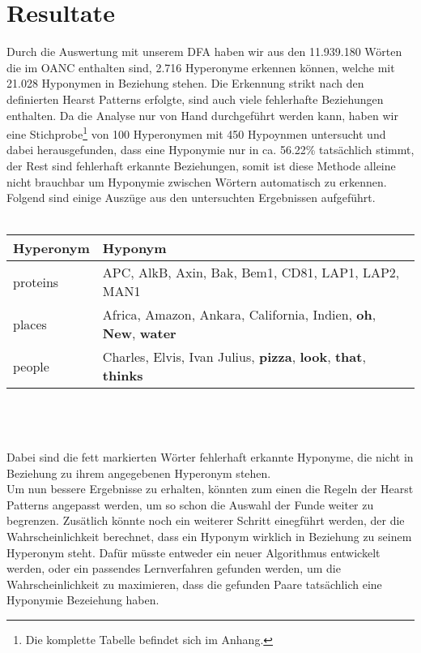 \section{Resultate}%
%
Durch die Auswertung mit unserem DFA haben wir aus den 11.939.180 Wörten
die im OANC enthalten sind, 2.716 Hyperonyme erkennen können, welche
mit 21.028 Hyponymen in Beziehung stehen. Die Erkennung strikt nach
den definierten Hearst Patterns erfolgte, sind auch viele fehlerhafte
Beziehungen enthalten. Da die Analyse nur von Hand durchgeführt werden
kann, haben wir eine Stichprobe\footnote{Die komplette Tabelle
  befindet sich im Anhang.} von 100 Hyperonymen mit 450 Hypoynmen
untersucht und dabei herausgefunden, dass eine Hyponymie nur in ca.
56.22\% tatsächlich stimmt, der Rest sind fehlerhaft erkannte
Beziehungen, somit ist diese Methode alleine nicht brauchbar um
Hyponymie zwischen Wörtern automatisch zu erkennen. Folgend sind einige
Auszüge aus den untersuchten Ergebnissen aufgeführt.%
~\\~\\%
\begin{tabularx}{\textwidth}{|l|X|}
  \hline
  \textbf{Hyperonym} & \textbf{Hyponym} \\
  \hline
  proteins & APC, AlkB, Axin, Bak, Bem1, CD81, LAP1,
  LAP2, MAN1 \\
  \hline
  places & Africa, Amazon, Ankara, California, Indien, \textbf{oh},
  \textbf{New}, \textbf{water} \\
  \hline
  people & Charles, Elvis, Ivan Julius,
  \textbf{pizza}, \textbf{look}, \textbf{that}, \textbf{thinks} \\
  \hline
\end{tabularx}%
~\\~\\~\\%
Dabei sind die fett markierten Wörter fehlerhaft erkannte Hyponyme,
die nicht in Beziehung zu ihrem angegebenen Hyperonym stehen.%
\\%
Um nun bessere Ergebnisse zu erhalten, könnten zum einen die Regeln
der Hearst Patterns angepasst werden, um so schon die Auswahl der
Funde weiter zu begrenzen. Zusätlich könnte noch ein weiterer
Schritt einegführt werden, der die Wahrscheinlichkeit berechnet, dass
ein Hyponym wirklich in Beziehung zu seinem Hyperonym steht. Dafür
müsste entweder ein neuer Algorithmus entwickelt werden, oder ein
passendes Lernverfahren gefunden werden, um die Wahrscheinlichkeit zu
maximieren, dass die gefunden Paare tatsächlich eine Hyponymie
Bezeiehung haben.